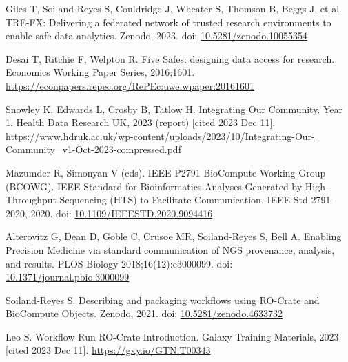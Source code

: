 \documentclass[10pt,letterpaper]{article}
\begin{document}
\begin{thebibliography}{10}
\begin{small}
Giles T, Soiland-Reyes S, Couldridge J, Wheater S, Thomson B, Beggs J, et al.
TRE-FX: Delivering a federated network of trusted research environments to enable safe data analytics.
Zenodo, 2023.
doi: \href{https://doi.org/10.5281/zenodo.10055354}{10.5281/zenodo.10055354}

Desai T, Ritchie F, Welpton R.
Five Safes: designing data access for research.
Economics Working Paper Series, 2016;1601.
\url{https://econpapers.repec.org/RePEc:uwe:wpaper:20161601}

Snowley K, Edwards L, Crosby B, Tatlow H.
Integrating Our Community. Year 1.
Health Data Research UK, 2023 (report) [cited 2023 Dec 11].
\url{https://www.hdruk.ac.uk/wp-content/uploads/2023/10/Integrating-Our-Community_v1-Oct-2023-compressed.pdf}

Mazumder R, Simonyan V (eds). IEEE P2791 BioCompute Working Group (BCOWG).
IEEE Standard for Bioinformatics Analyses Generated by High-Throughput Sequencing (HTS) to Facilitate Communication.
IEEE Std 2791-2020, 2020.
doi: \href{https://doi.org/10.1109/IEEESTD.2020.9094416}{10.1109/IEEESTD.2020.9094416}

Alterovitz G, Dean D, Goble C, Crusoe MR, Soiland-Reyes S, Bell A.
Enabling Precision Medicine via standard communication of NGS provenance, analysis, and results.
PLOS Biology 2018;16(12):e3000099.
doi: \href{https://doi.org/10.1371/journal.pbio.3000099}{10.1371/journal.pbio.3000099}

Soiland-Reyes S.
Describing and packaging workflows using RO-Crate and BioCompute Objects.
Zenodo, 2021.
doi: \href{https://doi.org/10.5281/zenodo.4633732}{10.5281/zenodo.4633732}

Leo S.
Workflow Run RO-Crate Introduction.
Galaxy Training Materials, 2023 [cited 2023 Dec 11].
\url{https://gxy.io/GTN:T00343}








\end{small}


\end{thebibliography}
\end{document}
